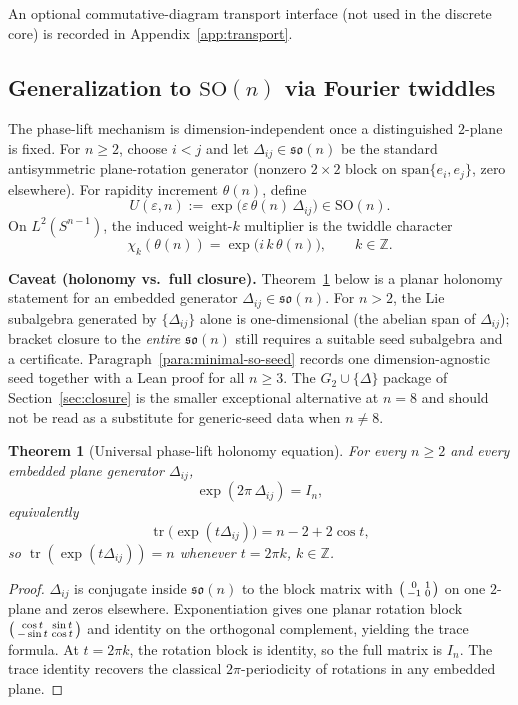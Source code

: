 \documentclass[11pt]{amsart}
\newtheorem{theorem}{Theorem}[section]
\begin{document}
An optional commutative-diagram transport interface (not used in the discrete core) is recorded in Appendix~\ref{app:transport}.

\subsection*{Generalization to \texorpdfstring{$\mathrm{SO}(n)$}{SO(n)} via Fourier twiddles}
The phase-lift mechanism is dimension-independent once a distinguished \(2\)-plane is fixed. For \(n\ge 2\), choose \(i<j\) and let \(\Delta_{ij}\in\mathfrak{so}(n)\) be the standard antisymmetric plane-rotation generator (nonzero \(2\times2\) block on \(\mathrm{span}\{e_i,e_j\}\), zero elsewhere). For rapidity increment \(\theta(n)\), define
\[
U(\varepsilon,n):=\exp\!\bigl(\varepsilon\,\theta(n)\,\Delta_{ij}\bigr)\in \mathrm{SO}(n).
\]
On \(L^2(S^{n-1})\), the induced weight-\(k\) multiplier is the twiddle character
\[
\chi_k(\theta(n))=\exp\!\bigl(i\,k\,\theta(n)\bigr),\qquad k\in\mathbb Z.
\]

\medskip
\noindent\textbf{Caveat (holonomy vs.\ full closure).} Theorem~\ref{thm:universal-holonomy} below is a planar holonomy statement for an embedded generator \(\Delta_{ij}\in\mathfrak{so}(n)\). For \(n>2\), the Lie subalgebra generated by \(\{\Delta_{ij}\}\) alone is one-dimensional (the abelian span of \(\Delta_{ij}\)); bracket closure to the \emph{entire} \(\mathfrak{so}(n)\) still requires a suitable seed subalgebra and a certificate. Paragraph~\ref{para:minimal-so-seed} records one dimension-agnostic seed together with a Lean proof for all \(n\ge 3\). The \(G_2\cup\{\Delta\}\) package of Section~\ref{sec:closure} is the smaller exceptional alternative at \(n=8\) and should not be read as a substitute for generic-seed data when \(n\neq 8\).

\begin{theorem}[Universal phase-lift holonomy equation]
\label{thm:universal-holonomy}
For every \(n\ge 2\) and every embedded plane generator \(\Delta_{ij}\),
\[
\exp(2\pi\,\Delta_{ij})=I_n,
\]
equivalently
\[
\operatorname{tr}\!\bigl(\exp(t\Delta_{ij})\bigr)=n-2+2\cos t,
\]
so \(\operatorname{tr}(\exp(t\Delta_{ij}))=n\) whenever \(t=2\pi k\), \(k\in\mathbb Z\).
\end{theorem}

\begin{proof}
\(\Delta_{ij}\) is conjugate inside \(\mathfrak{so}(n)\) to the block matrix with
\(\begin{psmallmatrix}0&1\\-1&0\end{psmallmatrix}\) on one \(2\)-plane and zeros elsewhere. Exponentiation gives one planar rotation block \(\begin{psmallmatrix}\cos t&\sin t\\-\sin t&\cos t\end{psmallmatrix}\) and identity on the orthogonal complement, yielding the trace formula. At \(t=2\pi k\), the rotation block is identity, so the full matrix is \(I_n\).
The trace identity recovers the classical \(2\pi\)-periodicity of rotations in any embedded plane.
\end{proof}
\end{document}
